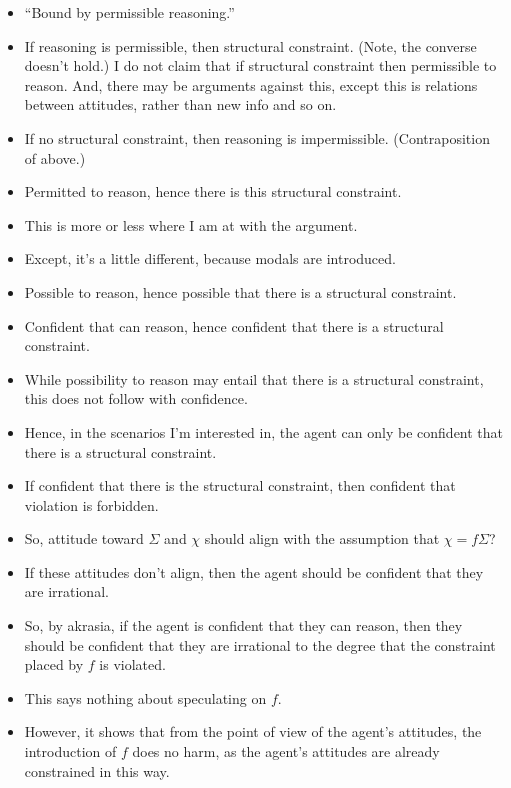 \documentclass[10pt]{article}
\begin{document}
\begin{itemize}
\item ``Bound by permissible reasoning.''
\item If reasoning is permissible, then structural constraint. (Note, the converse doesn't hold.)
  I do not claim that if structural constraint then permissible to reason.
  And, there may be arguments against this, except this is relations between attitudes, rather than new info and so on.
\item If no structural constraint, then reasoning is impermissible. (Contraposition of above.)
\item Permitted to reason, hence there is this structural constraint.
\item This is more or less where I am at with the argument.
\item Except, it's a little different, because modals are introduced.
\item Possible to reason, hence possible that there is a structural constraint.
\item Confident that can reason, hence confident that there is a structural constraint.
\item While possibility to reason may entail that there is a structural constraint, this does not follow with confidence.
\item Hence, in the scenarios I'm interested in, the agent can only be confident that there is a structural constraint.
\end{itemize}

\begin{itemize}
\item If confident that there is the structural constraint, then confident that violation is forbidden.
\item So, attitude toward \(\Sigma\) and \(\chi\) should align with the assumption that \(\chi = f\Sigma\)?
\item If these attitudes don't align, then the agent should be confident that they are irrational.
\item So, by akrasia, if the agent is confident that they can reason, then they should be confident that they are irrational to the degree that the constraint placed by \(f\) is violated.
\end{itemize}

\begin{itemize}
\item This says nothing about speculating on \(f\).
\item However, it shows that from the point of view of the agent's attitudes, the introduction of \(f\) does no harm, as the agent's attitudes are already constrained in this way.
\end{itemize}
\end{document}
